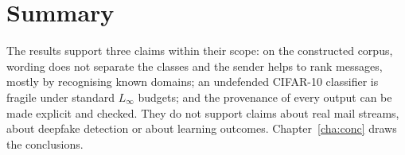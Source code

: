 \section{Summary}

The results support three claims within their scope: on the constructed corpus, wording does not separate the classes and the sender helps to rank messages, mostly by recognising known domains; an undefended CIFAR-10 classifier is fragile under standard $L_\infty$ budgets; and the provenance of every output can be made explicit and checked. They do not support claims about real mail streams, about deepfake detection or about learning outcomes. Chapter~\ref{cha:conc} draws the conclusions.
